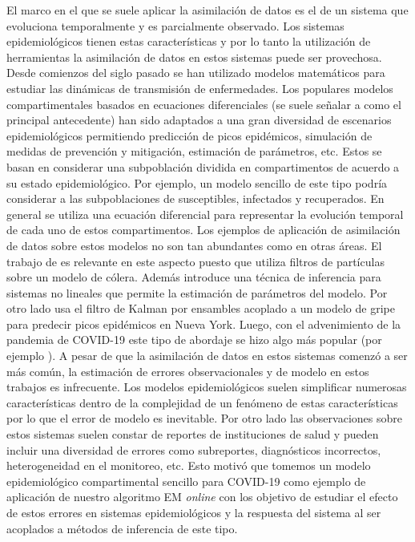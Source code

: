 El marco en el que se suele aplicar la asimilación de datos es el de un sistema que evoluciona temporalmente y es parcialmente observado. Los sistemas epidemiológicos tienen estas características y por lo tanto la utilización de herramientas la asimilación de datos en estos sistemas puede ser provechosa. Desde comienzos del siglo pasado se han utilizado modelos matemáticos para estudiar las dinámicas de transmisión de enfermedades. Los populares modelos compartimentales basados en ecuaciones diferenciales (se suele señalar a \cite{Kermack1927} como el principal antecedente) han sido adaptados a una gran diversidad de escenarios epidemiológicos permitiendo predicción de picos epidémicos, simulación de medidas de prevención y mitigación, estimación de parámetros, etc. Estos se basan en considerar una subpoblación dividida en compartimentos de acuerdo a su estado epidemiológico. Por ejemplo, un modelo sencillo de este tipo podría considerar a las subpoblaciones de susceptibles, infectados y recuperados. En general se utiliza una ecuación diferencial para representar la evolución temporal de cada uno de estos compartimentos. Los ejemplos de aplicación de asimilación de datos sobre estos modelos no son tan abundantes como en otras áreas. El trabajo de \cite{Ionides2006} es relevante en este aspecto puesto que utiliza filtros de partículas sobre un modelo de cólera. Además introduce una técnica de inferencia para sistemas no lineales que permite la estimación de parámetros del modelo. Por otro lado \cite{Shaman2012} usa el filtro de Kalman por ensambles acoplado a un modelo de gripe para predecir picos epidémicos en Nueva York. Luego, con el advenimiento de la pandemia de COVID-19 este tipo de abordaje se hizo algo más popular (por ejemplo \cite{Evensen2020, Li2020}). A pesar de que la asimilación de datos en estos sistemas comenzó a ser más común, la estimación de errores observacionales y de modelo en estos trabajos es infrecuente. Los modelos epidemiológicos suelen simplificar numerosas características dentro de la complejidad de un fenómeno de estas características por lo que el error de modelo es inevitable. Por otro lado las observaciones sobre estos sistemas suelen constar de reportes de instituciones de salud y pueden incluir una diversidad de errores como subreportes, diagnósticos incorrectos, heterogeneidad en el monitoreo, etc. Esto motivó que tomemos un modelo epidemiológico compartimental sencillo para COVID-19 como ejemplo de aplicación de nuestro algoritmo EM \textit{online} con los objetivo de estudiar el efecto de estos errores en sistemas epidemiológicos y la respuesta del sistema al ser acoplados a métodos de inferencia de este tipo.

